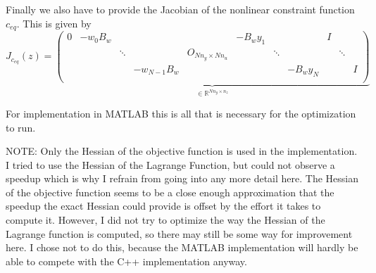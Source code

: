 \documentclass[
12pt, %
a4paper, %
onecolumn, %
portrait %
]{article}
\begin{document}
Finally we also have to provide the Jacobian of the nonlinear constraint function $c_{eq}$. This is given by
\begin{equation}
J_{c_{eq}}(z) = 
\underbrace{
\begin{pmatrix}
0 & -w_0 B_w &        &              &                        & -B_w y_1 &        &          & I &        &   \\
  &          & \ddots &              & O_{N n_y \times N n_u} &          & \ddots &          &   & \ddots &   \\
  &          &        & -w_{N-1} B_w &                        &          &        & -B_w y_N &   &        & I \\
\end{pmatrix}}_{
\in \mathbb{R}^{N n_y \times n_z}}
\end{equation}

For implementation in MATLAB this is all that is necessary for the optimization to run.

NOTE: Only the Hessian of the objective function is used in the implementation. I tried to use the Hessian of the Lagrange Function, but could not observe a speedup which is why I refrain from going into any more detail here. The Hessian of the objective function seems to be a close enough approximation that the speedup the exact Hessian could provide is offset by the effort it takes to compute it. However, I did not try to optimize the way the Hessian of the Lagrange function is computed, so there may still be some way for improvement here. I chose not to do this, because the MATLAB implementation will hardly be able to compete with the C++ implementation anyway.
\end{document}
